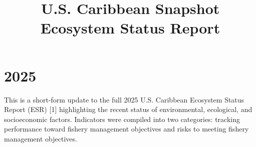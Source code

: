 \documentclass[
  10pt,
  letterpaper,
  DIV=11,
  numbers=noendperiod]{scrartcl}
\title{U.S. Caribbean \linebreak Snapshot Ecosystem Status Report}
\author{}
\date{}
\begin{document}
\maketitle



\vspace{-2.5cm}
\section{2025}

This is a short-form update to the full 2025 U.S. Caribbean Ecosystem
Status Report (ESR) {[}1{]} highlighting the recent status of
environmental, ecological, and socioeconomic factors. Indicators were
compiled into two categories: tracking performance toward fishery
management objectives and risks to meeting fishery management
objectives.

\vspace{0.2cm}
\end{document}
